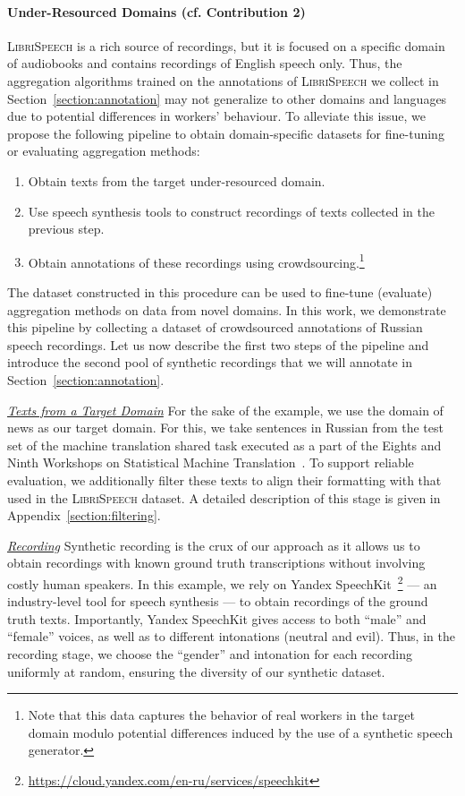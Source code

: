 \documentclass{article}
\newcommand{\libri}{\textsc{LibriSpeech}}
\begin{document}
\paragraph{Under-Resourced Domains (cf. Contribution 2)} \libri{} is a rich source of recordings, but it is focused on a specific domain of audiobooks and contains recordings of English speech only. Thus, the aggregation algorithms trained on the annotations of \libri{} we collect in Section~\ref{section:annotation} may not generalize to other domains and languages due to potential differences in workers' behaviour. To alleviate this issue, we propose the following pipeline to obtain domain-specific datasets for fine-tuning or evaluating aggregation methods:
\begin{enumerate}[itemsep=2pt, leftmargin=15pt, topsep=0pt]
  \item \label{step:synthetic} Obtain texts from the target under-resourced domain.  
  \item Use speech synthesis tools to construct recordings of texts collected in the previous step.
  \item Obtain annotations of these recordings using crowdsourcing.\footnote{Note that this data captures the behavior of real workers in the target domain modulo potential differences induced by the use of a synthetic speech generator.}
\end{enumerate}

The dataset constructed in this procedure can be used to fine-tune (evaluate) aggregation methods on data from novel domains. In this work, we demonstrate this pipeline by collecting a dataset of crowdsourced annotations of Russian speech recordings. Let us now describe the first two steps of the pipeline and introduce the second pool of synthetic recordings that we will annotate in Section~\ref{section:annotation}. 

\underline{\emph{Texts from a Target Domain}} For the sake of the example, we use the domain of news as our target domain. For this, we take sentences in Russian from the test set of the machine translation shared task executed as a part of the Eights and Ninth Workshops on Statistical Machine Translation~\citep{secondsmtworkshop, smtworkshop}. To support reliable evaluation, we additionally filter these texts to align their formatting with that used in the \libri{} dataset. A detailed description of this stage is given in Appendix~\ref{section:filtering}.

\underline{\emph{Recording}} Synthetic recording is the crux of our approach as it allows us to obtain recordings with known ground truth transcriptions without involving costly human speakers. In this example, we rely on Yandex SpeechKit~\footnote{\url{https://cloud.yandex.com/en-ru/services/speechkit}} --- an industry-level tool for speech synthesis --- to obtain recordings of the ground truth texts. Importantly, Yandex SpeechKit gives access to both ``male'' and ``female'' voices, as well as to different intonations (neutral and evil). Thus, in the recording stage, we choose the ``gender'' and intonation for each recording uniformly at random, ensuring the diversity of our synthetic dataset.
\end{document}
